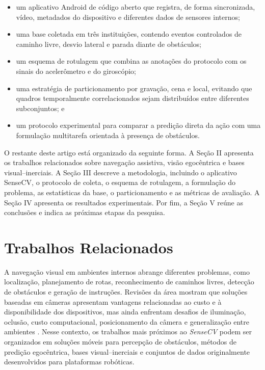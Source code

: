 \documentclass[conference]{IEEEtran}
\newcommand{\sensecv}{\textit{SenseCV}}
\begin{document}
\begin{itemize}
    \item um aplicativo Android de código aberto que registra, de forma sincronizada, vídeo, metadados do dispositivo e diferentes dados de sensores internos;

    \item uma base coletada em três instituições, contendo eventos controlados de caminho livre, desvio lateral e parada diante de obstáculos;

    \item um esquema de rotulagem que combina as anotações do protocolo com os sinais do acelerômetro e do giroscópio;

    \item uma estratégia de particionamento por gravação, cena e local, evitando que quadros temporalmente correlacionados sejam distribuídos entre diferentes subconjuntos; e

    \item um protocolo experimental para comparar a predição direta da ação com uma formulação multitarefa orientada à presença de obstáculos.
\end{itemize}

O restante deste artigo está organizado da seguinte forma. A Seção II apresenta os trabalhos relacionados sobre navegação assistiva, visão egocêntrica e bases visual--inerciais. A Seção III descreve a metodologia, incluindo o aplicativo SenseCV, o protocolo de coleta, o esquema de rotulagem, a formulação do problema, as estatísticas da base, o particionamento e as métricas de avaliação. A Seção IV apresenta os resultados experimentais. Por fim, a Seção V reúne as conclusões e indica as próximas etapas da pesquisa.


\section{Trabalhos Relacionados}

A navegação visual em ambientes internos abrange diferentes problemas, como localização, planejamento de rotas, reconhecimento de caminhos livres, detecção de obstáculos e geração de instruções. Revisões da área mostram que soluções baseadas em câmeras apresentam vantagens relacionadas ao custo e à disponibilidade dos dispositivos, mas ainda enfrentam desafios de iluminação, oclusão, custo computacional, posicionamento da câmera e generalização entre ambientes \cite{khan2022}. Nesse contexto, os trabalhos mais próximos ao \sensecv{} podem ser organizados em soluções móveis para percepção de obstáculos, métodos de predição egocêntrica, bases visual--inerciais e conjuntos de dados originalmente desenvolvidos para plataformas robóticas.
\end{document}
